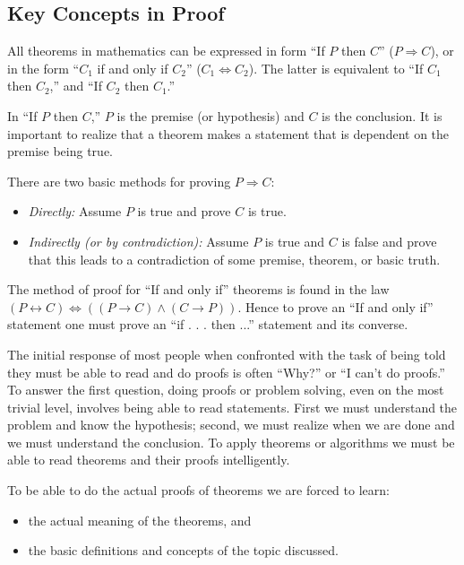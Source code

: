 \documentclass[10pt,]{book}
\theoremstyle{plain}
\theoremstyle{definition}
\theoremstyle{definition}
\theoremstyle{definition}
\theoremstyle{definition}
\begin{document}
\subsection[Key Concepts in Proof]{Key Concepts in Proof}\label{ss-proof-concepts}
All theorems in mathematics can be expressed in form ``If \(P\) then \(C\)'' (\(P \Rightarrow  C\)), or in the form ``\(C_1\) if and only if \(C_2\)'' (\(C_1 \Leftrightarrow C_2\)). The latter is equivalent to ``If \(C_1\) then \(C_2\),'' and ``If \(C_2\)
then \(C_1\).'' %
\par
In ``If \(P\) then \(C\),'' \(P\) is the premise (or hypothesis) and \(C\) is the conclusion.
It is important to realize that a theorem makes a statement that is dependent on the premise being true.%
\par
There are two basic methods for proving \(P \Rightarrow  C\):%
\par
\leavevmode%
\begin{itemize}[label=\textbullet]
\item{}\emph{Directly:} Assume \(P\) is true and prove \(C\) is true.%
\item{} \emph{Indirectly (or by contradiction):}  Assume \(P\) is true and \(C\) is false and prove that this leads to a contradiction of some premise, theorem, or basic truth.%
\end{itemize}
%
\par
The method of proof for ``If and only if'' theorems is found in the law \((P\leftrightarrow  C) \Leftrightarrow
 ((P \rightarrow  C) \land  (C \rightarrow  P))\). Hence to prove an ``If and only if'' statement one must prove an ``if . . . then ...'' statement and its converse.%
\par
The initial response of most people when confronted with the task of being told they must be able to read and do proofs is often ``Why?'' or ``I can't do proofs.'' To answer the first question, doing proofs or problem solving, even on the most trivial level, involves being able to read statements. First we must understand the problem and know the hypothesis; second, we must realize when we are done and we must understand the conclusion. To apply theorems or algorithms
we must be able to read theorems and their proofs intelligently.%
\par
To be able to do the actual proofs of theorems we are forced to learn:%
\par
\leavevmode%
\begin{itemize}[label=\textbullet]
\item{}the actual meaning of the theorems, and%
\item{}the basic definitions and concepts of the topic discussed.%
\end{itemize}
\end{document}
